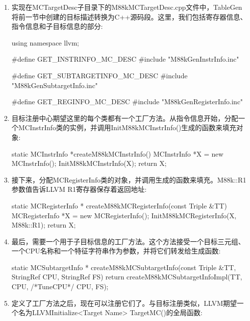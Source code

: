 \begin{enumerate}
\item
实现在MCTargetDesc子目录下的M88kMCTargetDesc.cpp文件中，TableGen将前一节中创建的目标描述转换为C++源码段。这里，我们包括寄存器信息、指令信息和子目标信息的部分:

\begin{cpp}
using namespace llvm;

#define GET_INSTRINFO_MC_DESC
#include "M88kGenInstrInfo.inc"

#define GET_SUBTARGETINFO_MC_DESC
#include "M88kGenSubtargetInfo.inc"

#define GET_REGINFO_MC_DESC
#include "M88kGenRegisterInfo.inc"
\end{cpp}

\item
目标注册中心期望这里的每个类都有一个工厂方法。从指令信息开始，分配一个MCInstrInfo类的实例，并调用InitM88kMCInstrInfo()生成的函数来填充对象:

\begin{cpp}
static MCInstrInfo *createM88kMCInstrInfo() {
    MCInstrInfo *X = new MCInstrInfo();
    InitM88kMCInstrInfo(X);
    return X;
}
\end{cpp}

\item
接下来，分配MCRegisterInfo类的对象，并调用生成的函数来填充。M88k::R1参数值告诉LLVM R1寄存器保存着返回地址:

\begin{cpp}
static MCRegisterInfo *
createM88kMCRegisterInfo(const Triple &TT) {
    MCRegisterInfo *X = new MCRegisterInfo();
    InitM88kMCRegisterInfo(X, M88k::R1);
    return X;
}
\end{cpp}

\item
最后，需要一个用于子目标信息的工厂方法。这个方法接受一个目标三元组、一个CPU名称和一个特征字符串作为参数，并将它们转发给生成函数:

\begin{cpp}
static MCSubtargetInfo *
createM88kMCSubtargetInfo(const Triple &TT,
StringRef CPU, StringRef FS) {
    return createM88kMCSubtargetInfoImpl(TT, CPU,
                                        /*TuneCPU*/ CPU,
                                        FS);
}
\end{cpp}

\item
定义了工厂方法之后，现在可以注册它们了。与目标注册类似，LLVM期望一个名为LLVMInitialize<Target Name> TargetMC()的全局函数:


\end{enumerate}
